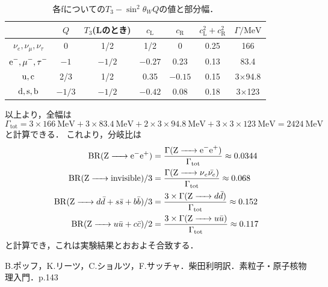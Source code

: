 \documentclass[a4paper,11pt]{jsarticle}
\begin{document}
\begin{table}[htbp]
  \centering
  \caption{各fについての$T_3 - \sin^2{\theta_W}Q$の値と部分幅．}
  \label{tab:c}
  \begin{tabular}{c|cc|cccc}
    \hline
    & $Q$ & $T_3$(Lのとき) & $c_{\mathrm{L}}$ & $c_{\mathrm{R}}$ & $c_{\mathrm{L}}^2+c_{\mathrm{R}}^2$ & $\Gamma/\si{\MeV}$ \\
    \hline\hline
    $\nu_e, \nu_{\mu}, \nu_{\tau}$ & 0 & 1/2 & 1/2 & 0 & 0.25 & 166 \\
    $\ce{e^-, \mu^-, \tau^-}$ & $-1$ & $-1/2$ & $-0.27$ & 0.23 & 0.13 & 83.4 \\
    $\ce{u, c}$ & 2/3 & 1/2 & 0.35 & $-0.15$ & 0.15 & 3$\times$94.8 \\
    $\ce{d, s, b}$ & $-1/3$ & $-1/2$ & $-0.42$ & 0.08 & 0.18 & 3$\times$123 \\
    \hline
  \end{tabular}
\end{table}
以上より，全幅は
\begin{equation}
  \Gamma_{\mathrm{tot}} = 3\times \SI{166}{\MeV} + 3\times \SI{83.4}{\MeV} + 2\times 3\times \SI{94.8}{\MeV} + 3\times 3\times \SI{123}{\MeV}  = \SI{2424}{\MeV}
\end{equation}
と計算できる．
これより，分岐比は
\begin{align}
  \mathrm{BR}(\ce{Z -> e^-e^+}) &= \frac{\Gamma(\ce{Z -> e^-e^+})}{\Gamma_{\mathrm{tot}}} \approx 0.0344\\
  \mathrm{BR}(\ce{Z -> invisible})/3 &= \frac{\Gamma(\ce{Z -> \nu_e}\bar{\nu_e})}{\Gamma_{\mathrm{tot}}} \approx 0.068\\
  \mathrm{BR}(\ce{Z -> }d\bar{d}+s\bar{s}+b\bar{b})/3 &= \frac{3\times\Gamma(\ce{Z -> }d\bar{d})}{\Gamma_{\mathrm{tot}}} \approx 0.152 \\
  \mathrm{BR}(\ce{Z -> }u\bar{u}+c\bar{c})/2 &= \frac{3\times\Gamma(\ce{Z -> }u\bar{u})}{\Gamma_{\mathrm{tot}}} \approx 0.117
\end{align}
と計算でき，これは実験結果とおおよそ合致する．

\begin{thebibliography}{99}
   B.ポッフ，K.リーツ，C.ショルツ，F.サッチャ．柴田利明訳．素粒子・原子核物理入門．p.143
\end{thebibliography}
\end{document}
